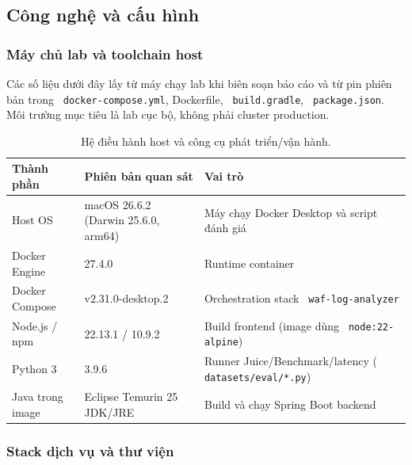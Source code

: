 \documentclass[runningheads]{report-template/llncs}
\newcommand{\code}[1]{\texttt{\small\hyphenchar\font=45 #1}}
\begin{document}
\subsection{Công nghệ và cấu hình}

\subsubsection{Máy chủ lab và toolchain host}

Các số liệu dưới đây lấy từ máy chạy lab khi biên soạn báo cáo và từ
pin phiên bản trong \code{docker-compose.yml}, Dockerfile,
\code{build.gradle}, \code{package.json}. Môi trường mục tiêu là lab cục
bộ, không phải cluster production.

\begin{table}
\caption{Hệ điều hành host và công cụ phát triển/vận hành.}
\label{tab:host-env}
\centering\scriptsize
\begin{tabularx}{\textwidth}{@{}p{34mm}p{40mm}Y@{}}
\toprule
Thành phần & Phiên bản quan sát & Vai trò\\
\midrule
Host OS & macOS 26.6.2 (Darwin 25.6.0, arm64) & Máy chạy Docker Desktop
và script đánh giá\\
Docker Engine & 27.4.0 & Runtime container\\
Docker Compose & v2.31.0-desktop.2 & Orchestration stack
\code{waf-log-analyzer}\\
Node.js / npm & 22.13.1 / 10.9.2 & Build frontend (image dùng
\code{node:22-alpine})\\
Python 3 & 3.9.6 & Runner Juice/Benchmark/latency
(\code{datasets/eval/*.py})\\
Java trong image & Eclipse Temurin 25 JDK/JRE & Build và chạy Spring Boot
backend\\
\bottomrule
\end{tabularx}
\end{table}

\subsubsection{Stack dịch vụ và thư viện}
\end{document}
